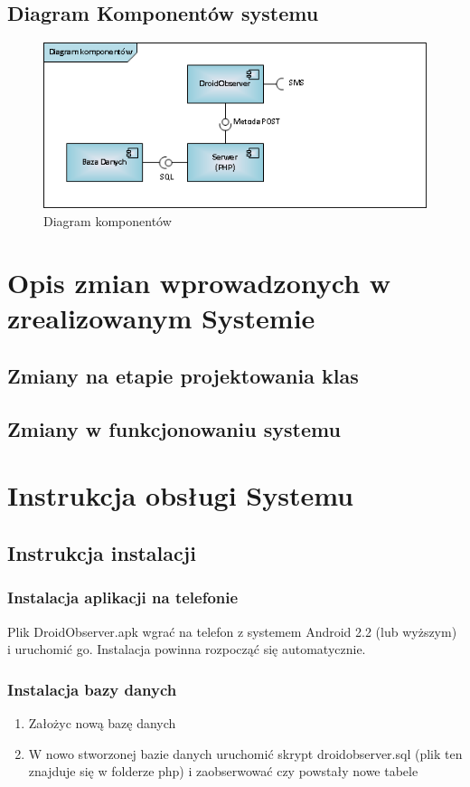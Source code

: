 \documentclass[11pt,a4paper]{article}
\begin{document}
\subsection {Diagram Komponentów systemu}
\begin{figure}[h]
    \includegraphics[scale=0.6]{component.png}
    \caption{Diagram komponentów}
 \end{figure}
\section {Opis zmian wprowadzonych w zrealizowanym Systemie }
\subsection {Zmiany na etapie projektowania klas}
\subsection {Zmiany w funkcjonowaniu systemu}

\newpage
\section {Instrukcja obsługi Systemu}
\subsection{Instrukcja instalacji}

\subsubsection{Instalacja aplikacji na telefonie}
Plik DroidObserver.apk wgrać na telefon z systemem Android 2.2 (lub wyższym) i uruchomić go.
Instalacja powinna rozpocząć się automatycznie.

\subsubsection{Instalacja bazy danych}
\begin{enumerate}
\item Założyc nową bazę danych
\item W nowo stworzonej bazie danych uruchomić skrypt droidobserver.sql (plik ten znajduje się w folderze php) i zaobserwować czy powstały nowe tabele
\end{enumerate}
\end{document}
